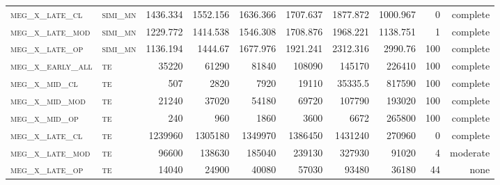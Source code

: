 \begin{landscape}
\begin{center}
\begin{footnotesize}
\begin{longtable}{llrrrrr|rrr}
\textsc{meg\_x\_late\_cl  } & \textsc{simi\_mn  }    & 1436.334 & 1552.156 & 1636.366 & 1707.637 & 1877.872  & 1000.967      & 0             & complete            \\
\textsc{meg\_x\_late\_mod } & \textsc{simi\_mn  }    & 1229.772 & 1414.538 & 1546.308 & 1708.876 & 1968.221  & 1138.751      & 1             & complete             \\
\textsc{meg\_x\_late\_op  } & \textsc{simi\_mn  }    & 1136.194 & 1444.67  & 1677.976 & 1921.241 & 2312.316  & 2990.76       & 100           & complete             \\
\textsc{meg\_x\_early\_all} & \textsc{te  		}    & 35220    & 61290    & 81840    & 108090   & 145170    & 226410        & 100           & complete             \\
\textsc{meg\_x\_mid\_cl   } & \textsc{te  		}    & 507      & 2820     & 7920     & 19110    & 35335.5   & 817590        & 100           & complete             \\
\textsc{meg\_x\_mid\_mod  } & \textsc{te 		}    & 21240    & 37020    & 54180    & 69720    & 107790    & 193020        & 100           & complete             \\
\textsc{meg\_x\_mid\_op   } & \textsc{te 		}    & 240      & 960      & 1860     & 3600     & 6672      & 265800        & 100           & complete             \\
\textsc{meg\_x\_late\_cl  } & \textsc{te 		}    & 1239960  & 1305180  & 1349970  & 1386450  & 1431240   & 270960        & 0             & complete            \\
\textsc{meg\_x\_late\_mod } & \textsc{te 		}    & 96600    & 138630   & 185040   & 239130   & 327930    & 91020         & 4             & moderate             \\
\textsc{meg\_x\_late\_op  } & \textsc{te 		}    & 14040    & 24900    & 40080    & 57030    & 93480     & 36180         & 44            & none            


\end{longtable}
\end{footnotesize}
\end{center}
\end{landscape}

\restoregeometry
\pagestyle{headings}


